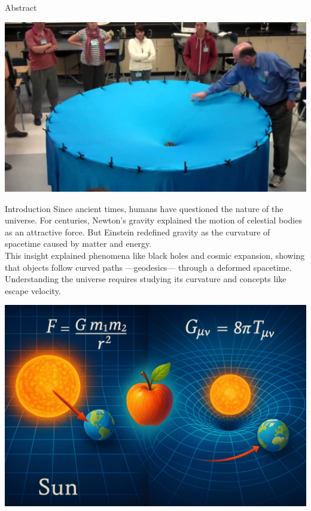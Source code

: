 \documentclass[final]{beamer}
\newlength{\colwidth}
\begin{document}
\begin{frame}[t]
\begin{columns}[t]
\begin{column}{\colwidth}
\begin{block}{Abstract}
\begin{enumerate}
    \end{enumerate}
    \begin{center}
      \includegraphics[scale=0.5]{manta.jpg}
    \end{center}
  \end{block}

  \begin{block}{Introduction}
  Since ancient times, humans have questioned the nature of the universe. For centuries, Newton's gravity explained the motion of celestial bodies as an attractive force. But Einstein redefined gravity as the curvature of spacetime caused by matter and energy.\\
  This insight explained phenomena like black holes and cosmic expansion, showing that objects follow curved paths —geodesics— through a deformed spacetime. Understanding the universe requires studying its curvature and concepts like escape velocity.
  \begin{center}
    \includegraphics[scale=0.3]{chatgptimagen2.png}  
  \end{center}
  

\end{block}
\end{column}
\end{columns}
\end{frame}
\end{document}

